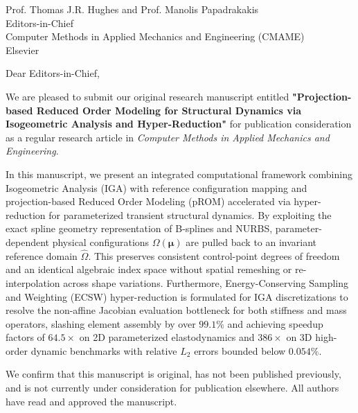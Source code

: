 \documentclass[11pt]{letter}
\begin{document}
\date{September 17, 2026}

\begin{letter}{Prof. Thomas J.R. Hughes and Prof. Manolis Papadrakakis\\Editors-in-Chief\\Computer Methods in Applied Mechanics and Engineering (CMAME)\\Elsevier}

\opening{Dear Editors-in-Chief,}

We are pleased to submit our original research manuscript entitled \textbf{"Projection-based Reduced Order Modeling for Structural Dynamics via Isogeometric Analysis and Hyper-Reduction"} for publication consideration as a regular research article in \textit{Computer Methods in Applied Mechanics and Engineering}.

In this manuscript, we present an integrated computational framework combining Isogeometric Analysis (IGA) with reference configuration mapping and projection-based Reduced Order Modeling (pROM) accelerated via hyper-reduction for parameterized transient structural dynamics. By exploiting the exact spline geometry representation of B-splines and NURBS, parameter-dependent physical configurations $\Omega(\bm{\mu})$ are pulled back to an invariant reference domain $\hat{\Omega}$. This preserves consistent control-point degrees of freedom and an identical algebraic index space without spatial remeshing or re-interpolation across shape variations. Furthermore, Energy-Conserving Sampling and Weighting (ECSW) hyper-reduction is formulated for IGA discretizations to resolve the non-affine Jacobian evaluation bottleneck for both stiffness and mass operators, slashing element assembly by over $99.1\%$ and achieving speedup factors of $64.5\times$ on 2D parameterized elastodynamics and $386\times$ on 3D high-order dynamic benchmarks with relative $L_2$ errors bounded below $0.054\%$.

We confirm that this manuscript is original, has not been published previously, and is not currently under consideration for publication elsewhere. All authors have read and approved the manuscript.


\end{letter}
\end{document}

